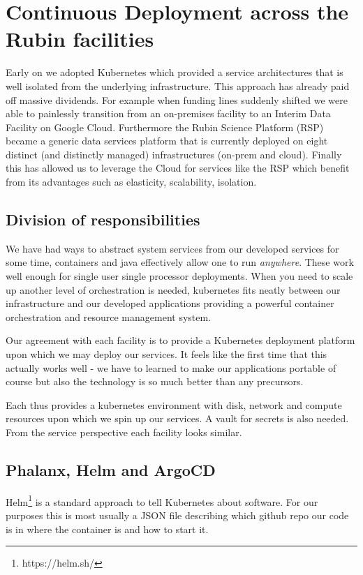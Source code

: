 \section{Continuous Deployment across the Rubin facilities} \label{sec:deploy}

Early on we adopted Kubernetes which provided a service architectures that is well isolated from the underlying infrastructure.
This approach has already paid off massive dividends.
For example when funding lines suddenly shifted we were able to painlessly transition from an on-premises facility to an Interim Data Facility on Google Cloud.
Furthermore the Rubin Science Platform (RSP) became a generic data services platform that is currently deployed on eight distinct (and distinctly managed) infrastructures (on-prem and cloud).
Finally this has allowed us to leverage the Cloud for services like the RSP which benefit from its advantages such as elasticity, scalability, isolation.


\subsection{Division of responsibilities}
We have had ways to abstract system services from our developed services for some time, containers and java effectively allow one to run \emph{anywhere}.
These work well enough for single user single processor deployments.
When you need to scale up another level of orchestration is needed, kubernetes fits neatly between our infrastructure and our developed applications providing a powerful container orchestration and resource management system.

Our agreement with each facility is to provide a Kubernetes deployment platform upon which we may deploy our services.
It feels like the first time that this actually works well - we have to learned to make our applications portable of course but also the technology is so much better than any precursors.

Each thus provides a kubernetes environment with disk, network and compute resources upon which we spin up our services.
A vault for secrets is also needed.
From the service perspective each facility looks similar.

\subsection{Phalanx, Helm and ArgoCD}

Helm\footnote{https://helm.sh/} is a standard approach to tell Kubernetes about software.
For our purposes this is most usually a JSON file describing which github repo our code is in where the container is and how to start it.

